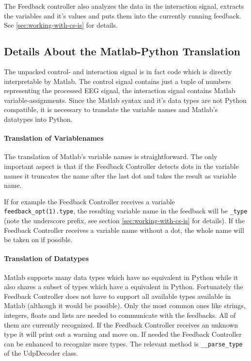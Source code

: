 The Feedback controller also analyzes the data in the interaction signal, extracts the variables and it's values and puts them into the currently running feedback. See \ref{sec:working-with-cs-is} for details.

\subsection{Details About the Matlab-Python Translation}
The unpacked control- and interaction signal is in fact code which is directly interpretable by Matlab. The control signal contains just a tuple of numbers representing the processed EEG signal, the interaction signal contains Matlab variable-assignments. Since the Matlab syntax and it's data types are not Python compatible, it is necessary to translate the variable names and Matlab's datatypes into Python.

\paragraph{Translation of Variablenames}
The translation of Matlab's variable names is straightforward. The only important aspect is that if the Feedback Controller detects dots in the variable names it truncates the name after the last dot and takes the result as variable name.

If for example the Feedback Controller receives a variable \verb+feedback_opt(1).type+, the resulting variable name in the feedback will be \lstinline+_type+ (note the underscore prefix, see section \ref{sec:working-with-cs-is} for details). If the Feedback Controller receives a variable name without a dot, the whole name will be taken on if possible.

\paragraph{Translation of Datatypes}
Matlab supports many data types which have no equivalent in Python while it also shares a subset of types which have a equivalent in Python. Fortunately the Feedback Controller does not have to support all available types available in Matlab (although it would be possible). Only the most common ones like strings, integers, floats and lists are needed to communicate with the feedbacks. All of them are currently recognized. If the Feedback Controller receives an unknown type it will print out a warning and move on. If needed the Feedback Controller can be enhanced to recognize more types. The relevant method is \lstinline+__parse_type+ of the UdpDecoder class.


